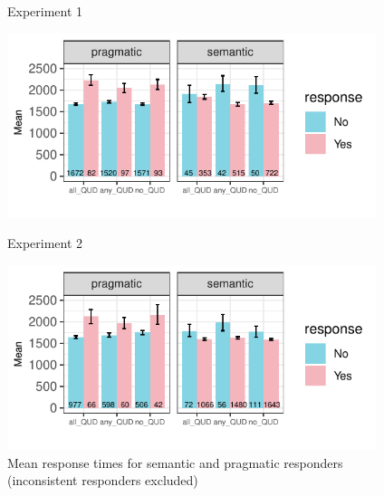 \documentclass[12pt]{article}
\begin{document}
\begin{figure}[!ht] 
    \begin{minipage}{.5\textwidth}
        \caption*{Experiment 1}
        \includegraphics[height=5.4cm]{img/exp1_responder.pdf}
    \end{minipage}%
    \begin{minipage}{.5\textwidth}
        \caption*{Experiment 2}
        \includegraphics[height=5.4cm]{img/exp2_responder.pdf}
    \end{minipage}%
    \caption{Mean response times for semantic and pragmatic responders (inconsistent responders excluded)}
\end{figure}
\end{document}
